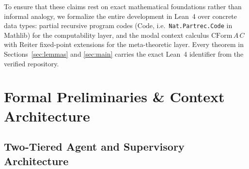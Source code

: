 \documentclass[11pt]{article}
\theoremstyle{plain}
\theoremstyle{definition}
\theoremstyle{remark}
\newcommand{\Code}{\mathrm{Code}}
\newcommand{\CForm}{\mathrm{CForm}}
\begin{document}
To ensure that these claims rest on exact mathematical foundations rather than
informal analogy, we formalize the entire development in Lean~4 over concrete
data types: partial recursive program codes ($\Code$, i.e.\
\texttt{Nat.Partrec.Code} in Mathlib) for the computability layer, and the modal
context calculus $\CForm\,A\,C$ with Reiter fixed-point extensions for the
meta-theoretic layer. Every theorem in Sections~\ref{sec:lemmas} and
\ref{sec:main} carries the exact Lean~4 identifier from the verified repository.

\section{Formal Preliminaries \& Context Architecture}\label{sec:prelim}

\subsection{Two-Tiered Agent and Supervisory Architecture}
\end{document}
